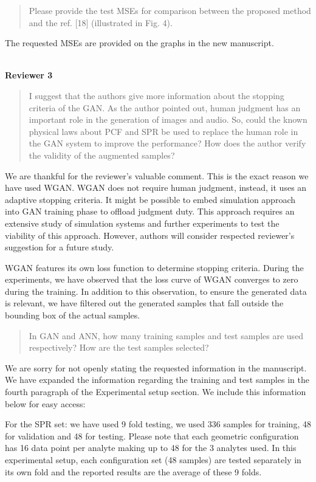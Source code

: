 \documentclass{article}
\begin{document}
	\begin{quote}
	Please provide the test MSEs for comparison between the proposed method and the ref. [18] (illustrated in Fig. 4).
	\end{quote}
	
	The requested MSEs are provided on the graphs in the new manuscript. \\
	
	~
	
	{\bfseries\large Reviewer 3}
	
	\begin{quote}
	I suggest that the authors give more information about the stopping criteria of the GAN. As the author pointed out, human judgment has an important role in the generation of images and audio. So, could the known physical laws about PCF and SPR be used to replace the human role in the GAN system to improve the performance? How does the author verify the validity of the augmented samples?
	\end{quote}
	
	We are thankful for the reviewer's valuable comment. This is the exact reason we have used WGAN. WGAN does not require human judgment, instead, it uses an adaptive stopping criteria. It might be possible to embed simulation approach into GAN training phase to offload judgment duty. This approach requires an extensive study of simulation systems and further experiments to test the viability of this approach. However, authors will consider respected reviewer's suggestion for a future study.
	
	WGAN features its own loss function to determine stopping criteria. During the experiments, we have observed that the loss curve of WGAN converges to zero during the training. In addition to this observation, to ensure the generated data is relevant, we have filtered out the generated samples that fall outside the bounding box of the actual samples.
	
	\begin{quote}
	 In GAN and ANN, how many training samples and test samples are used respectively? How are the test samples selected?
	\end{quote}
	
	We are sorry for not openly stating the requested information in the manuscript. We have expanded the information regarding the training and test samples in the fourth paragraph of the Experimental setup section. We include this information below for easy access:
	
	For the SPR set: we have used 9 fold testing, we used 336 samples for training, 48 for validation and 48 for testing. Please note that each geometric configuration has 16 data point per analyte making up to 48 for the 3 analytes used. In this experimental setup, each configuration set (48 samples) are tested separately in its own fold and the reported results are the average of these 9 folds.
	
\end{document}
